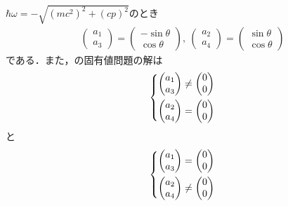 \documentclass{report}
\begin{document}
$\hbar\omega = -\sqrt{(mc^2)^2 + (cp)^2}$のとき
\begin{align}
  \begin{pmatrix}
    a_1\\a_3
  \end{pmatrix}
  =
  \begin{pmatrix}
    -\sin\theta\\\cos\theta
  \end{pmatrix}
  ,\ 
  \begin{pmatrix}
    a_2\\a_4
  \end{pmatrix}
  =
  \begin{pmatrix}
    \sin\theta\\\cos\theta
  \end{pmatrix}
\end{align}
である．また，の固有値問題の解は
\begin{align}
  \begin{dcases}
    \begin{pmatrix}
      a_1\\a_3
    \end{pmatrix}
    \neq
    \begin{pmatrix}
      0\\0
    \end{pmatrix}\\
    \begin{pmatrix}
      a_2\\a_4
    \end{pmatrix}
    =
    \begin{pmatrix}
      0\\0
    \end{pmatrix}
  \end{dcases}
\end{align}
と
\begin{align}
  \begin{dcases}
    \begin{pmatrix}
      a_1\\a_3
    \end{pmatrix}
    =
    \begin{pmatrix}
      0\\0
    \end{pmatrix}\\
    \begin{pmatrix}
      a_2\\a_4
    \end{pmatrix}
    \neq
    \begin{pmatrix}
      0\\0
    \end{pmatrix}
  \end{dcases}
\end{align}
\end{document}
